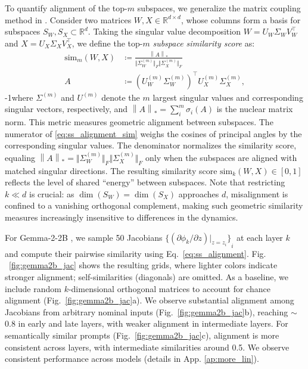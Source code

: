 \documentclass{article}
\newcommand{\bR}{\mathbb{R}}
\newcommand{\norm}[1]{\left\lVert#1\right\rVert}
\theoremstyle{plain}
\theoremstyle{definition}
\theoremstyle{remark}
\begin{document}
To quantify alignment of the top-$m$ subspaces, we generalize the matrix coupling method in \citet{aubry2025transformer}.
Consider two matrices $W,X \in \bR^{d\times d}$, whose columns form a basis for subspaces $S_W, S_X \subset \bR^{d}$. Taking the singular value decomposition $W = U_W \Sigma_W V_W^\top$ and $X = U_X \Sigma_X V_X^\top$, we define the top-$m$ \textit{subspace similarity score} as:
\begin{subequations}\label{eq:ss_alignment}
\begin{align}
    \text{sim}_m(W,X) &\coloneqq \textstyle\frac{\norm{A}_*}{\big\Vert\Sigma^{(m)}_W\big\Vert_F\big\Vert\Sigma^{(m)}_X\big\Vert_F} \label{eq:ss_alignment_sim}\\
    A &\coloneqq (U^{(m)}_W \Sigma^{(m)}_W)^\top U^{(m)}_X \Sigma^{(m)}_X,
\end{align}
\end{subequations}
\looseness-1where $\Sigma^{(m)}$ and $U^{(m)}$ denote the $m$ largest singular values and corresponding singular vectors, respectively, and $\norm{A}_* = \sum_i^m \sigma_i(A)$ is the nuclear matrix norm. This metric measures geometric alignment between subspaces. The numerator of \eqref{eq:ss_alignment_sim} weighs the cosines of principal angles by the corresponding singular values. The denominator normalizes the similarity score, equaling $\norm{A}_* = \big\Vert\Sigma^{(m)}_W\big\Vert_F\big\Vert\Sigma^{(m)}_X\big\Vert_F$ only when the subspaces are aligned with matched singular directions. The resulting similarity score $\text{sim}_k(W,X) \in [0,1]$ reflects the level of shared ``energy'' between subspaces. Note that restricting $k \ll d$ is crucial: as $\dim(S_W) = \dim(S_X)$ approaches $d$, misalignment is confined to a vanishing orthogonal complement, making such geometric similarity measures increasingly insensitive to differences in the dynamics.

For Gemma-2-2B \cite{gemma_2024}, we sample 50 Jacobians ${\{(\partial \phi_k/\partial z)|_{z=z_i}\}}_i$ at each layer $k$ and compute their pairwise similarity using Eq.~\ref{eq:ss_alignment}.
Fig. ~\ref{fig:gemma2b_jac} shows the resulting grids, where lighter colors indicate stronger alignment; self-similarities (diagonals) are omitted. As a baseline, we include random $k$-dimensional orthogonal matrices to account for chance alignment (Fig.~\ref{fig:gemma2b_jac}a).
We observe substantial alignment among Jacobians from arbitrary nominal inputs (Fig.~\ref{fig:gemma2b_jac}b), reaching $\sim$0.8 in early and late layers, with weaker alignment in intermediate layers. For semantically similar prompts (Fig.~\ref{fig:gemma2b_jac}c), alignment is more consistent across layers, with intermediate similarities around 0.5. We observe consistent performance across models (details in App. \ref{ap:more_lin}).
\end{document}
